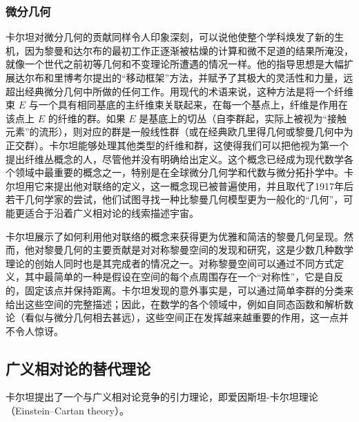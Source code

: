 \subsubsection{微分几何}  
卡尔坦对微分几何的贡献同样令人印象深刻，可以说他使整个学科焕发了新的生机，因为黎曼和达尔布的最初工作正逐渐被枯燥的计算和微不足道的结果所淹没，就像一个世代之前初等几何和不变理论所遭遇的情况一样。他的指导思想是大幅扩展达尔布和里博考尔提出的“移动框架”方法，并赋予了其极大的灵活性和力量，远超出经典微分几何中所做的任何工作。用现代的术语来说，这种方法是将一个纤维束 \( E \) 与一个具有相同基底的主纤维束关联起来，在每一个基点上，纤维是作用在该点上 \( E \) 的纤维的群。如果 \( E \) 是基底上的切丛（自李群起，实际上被视为“接触元素”的流形），则对应的群是一般线性群（或在经典欧几里得几何或黎曼几何中为正交群）。卡尔坦能够处理其他类型的纤维和群，这使得我们可以把他视为第一个提出纤维丛概念的人，尽管他并没有明确给出定义。这个概念已经成为现代数学各个领域中最重要的概念之一，特别是在全球微分几何学和代数与微分拓扑学中。卡尔坦用它来提出他对联络的定义，这一概念现已被普遍使用，并且取代了1917年后若干几何学家的尝试，他们试图寻找一种比黎曼几何模型更为一般化的“几何”，可能更适合于沿着广义相对论的线索描述宇宙。

卡尔坦展示了如何利用他对联络的概念来获得更为优雅和简洁的黎曼几何呈现。然而，他对黎曼几何的主要贡献是对对称黎曼空间的发现和研究，这是少数几种数学理论的创始人同时也是其完成者的情况之一。对称黎曼空间可以通过不同方式定义，其中最简单的一种是假设在空间的每个点周围存在一个“对称性”，它是自反的，固定该点并保持距离。卡尔坦发现的意外事实是，可以通过简单李群的分类来给出这些空间的完整描述；因此，在数学的各个领域中，例如自同态函数和解析数论（看似与微分几何相去甚远），这些空间正在发挥越来越重要的作用，这一点并不令人惊讶。
\subsection{广义相对论的替代理论}  
卡尔坦提出了一个与广义相对论竞争的引力理论，即爱因斯坦-卡尔坦理论（Einstein–Cartan theory）。
